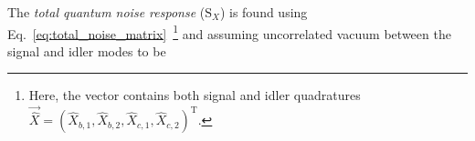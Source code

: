 
The \emph{total quantum noise response} ($\text{S}_X$) is found using Eq.~\ref{eq:total_noise_matrix}~\footnote{Here, the vector contains both signal and idler quadratures $\vec{\hat X}=(\hat X_{b,1},\hat X_{b,2},\hat X_{c,1},\hat X_{c,2})^\text{T}$.} and assuming uncorrelated vacuum between the signal and idler modes to be~\cite{schoriNarrowbandFrequencyTunable2002}
